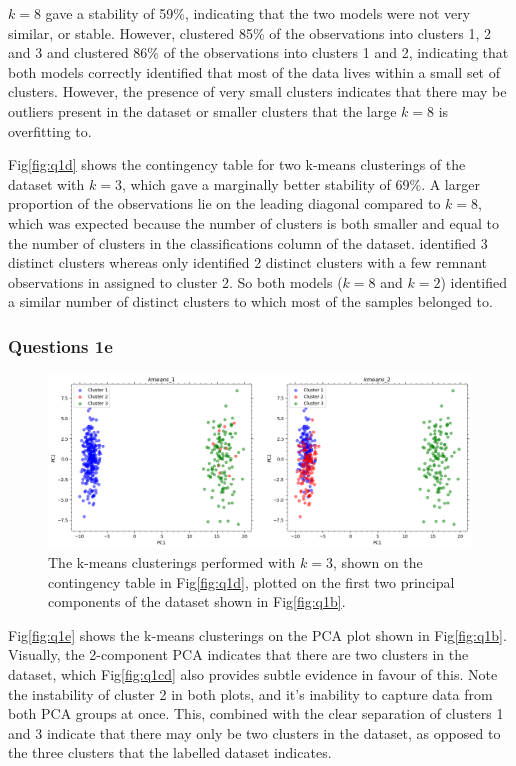     $k=8$ gave a stability of 59\%, indicating that the two models were not very similar, or stable.
    However,  clustered 85\% of the observations into clusters 1, 2 and 3 and 
    clustered 86\% of the observations into clusters 1 and 2, indicating that both models correctly identified that most of the data
    lives within a small set of clusters.
    However, the presence of very small clusters indicates that there may be outliers present in the dataset or smaller
    clusters that the large $k=8$ is overfitting to.

    Fig\eqref{fig:q1d} shows the contingency table for two k-means clusterings of the dataset with $k=3$, which gave a
    marginally better stability of 69\%.
    A larger proportion of the observations lie on the leading diagonal compared to $k=8$, which was expected because
    the number of clusters is both smaller and equal to the number of clusters in the classifications column of the
    dataset.
     identified 3 distinct clusters whereas  only identified 2 distinct
    clusters with a few remnant observations in assigned to cluster 2.
    So both models ($k=8$ and $k=2$) identified a similar number of distinct clusters to which most of the samples
    belonged to.

\subsubsection{Questions 1e}\label{subsubsec:q1e}
    \begin{figure}[htb]
    \centering
    \includegraphics[width=1\textwidth]{./figures/q1e}
    \caption{The k-means clusterings performed with $k=3$, shown on the contingency table in Fig\eqref{fig:q1d}, plotted
        on the first two principal components of the dataset shown in Fig\eqref{fig:q1b}.}
    \label{fig:q1e}
    \end{figure}

    Fig\eqref{fig:q1e} shows the k-means clusterings on the PCA plot shown in Fig\eqref{fig:q1b}.
    Visually, the 2-component PCA indicates that there are two clusters in the dataset, which  Fig\eqref{fig:q1cd} also
    provides subtle evidence in favour of this.
    Note the instability of cluster 2 in both plots, and it's inability to capture data from both PCA groups at once.
    This, combined with the clear separation of clusters 1 and 3 indicate that there may only be two clusters in the
    dataset, as opposed to the three clusters that the labelled dataset indicates.

